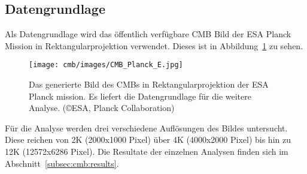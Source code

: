 \subsection{Datengrundlage}
Als Datengrundlage wird das öffentlich verfügbare CMB Bild der ESA Planck 
Mission in Rektangularprojektion \cite{cmb:public_equirectangular} 
verwendet. Dieses ist in Abbildung~\ref{fig:cmb-rectangular} zu sehen.

\begin{figure}
	\centering
	\texttt{[image: cmb/images/CMB\_Planck\_E.jpg]}
	\caption{Das generierte Bild des CMBs in Rektangularprojektion der ESA 
		Planck mission. Es liefert die Datengrundlage für die weitere Analyse. 
		(\copyright ESA, Planck Collaboration)}
	\label{fig:cmb-rectangular}
\end{figure}

Für die Analyse werden drei verschiedene Auflösungen des Bildes untersucht. 
Diese reichen von 2K (2000x1000 Pixel) über 4K (4000x2000 Pixel) bis hin zu 12K 
(12572x6286 Pixel). Die Resultate der einzelnen Analysen finden sich im 
Abschnitt~\ref{subsec:cmb:results}.
